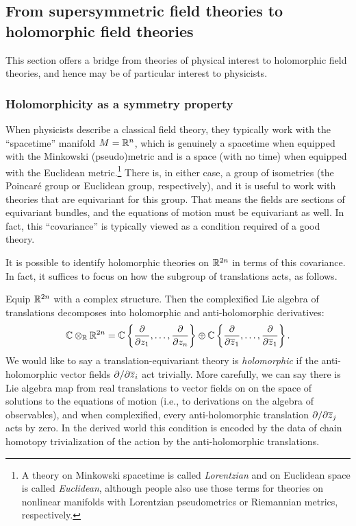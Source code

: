 \documentclass[11pt]{amsart}
\def\del{\partial}
\begin{document}
\subsection{From supersymmetric field theories to holomorphic field theories}



This section offers a bridge from theories of physical interest to holomorphic field theories,
and hence may be of particular interest to physicists.

\subsubsection{Holomorphicity as a symmetry property}

When physicists describe a classical field theory,
they typically work with the ``spacetime'' manifold $M = \mathbb R^n$,
which is genuinely a spacetime when equipped with the Minkowski (pseudo)metric and is a space (with no time) when equipped with the Euclidean metric.\footnote{A theory on Minkowski spacetime is called {\it Lorentzian} and on Euclidean space is called {\it Euclidean},
although people also use those terms for theories on nonlinear manifolds with Lorentzian pseudometrics or Riemannian metrics, respectively.}
There is, in either case, a group of isometries (the Poincar\'e group or Euclidean group, respectively),
and it is useful to work with theories that are equivariant for this group.
That means the fields are sections of equivariant bundles,
and the equations of motion must be equivariant as well.
In fact, this ``covariance'' is typically viewed as a condition required of a good theory.

It is possible to identify holomorphic theories on $\mathbb R^{2n}$ in terms of this covariance.
In fact, it suffices to focus on how the subgroup of translations acts, as follows.

Equip $\mathbb R^{2n}$ with a complex structure.
Then the complexified Lie algebra of translations decomposes into holomorphic and anti-holomorphic derivatives:
\[
\mathbb C \otimes_{\mathbb R} \mathbb R^{2n} 
= \mathbb C\left\{\frac{\partial}{\partial z_1}, \ldots, \frac{\partial}{\partial z_n}\right\} 
\oplus \mathbb C\left\{\frac{\partial}{\partial {\overline{z}}_1}, \ldots, \frac{\partial}{\partial {\overline{z}}_1}\right\}.
\]
We would like to say a translation-equivariant theory is {\em holomorphic} if the anti-holomorphic vector fields $\del / \del {\zbar_i}$ act trivially.
More carefully, we can say there is Lie algebra map from real translations to vector fields on on the space of solutions to the equations of motion (i.e., to derivations on the algebra of observables),
and when complexified, every anti-holomorphic translation $\partial/\partial {\overline{z}}_j$ acts by zero.
In the derived world this condition is encoded by the data of chain homotopy trivialization of the action by the anti-holomorphic translations. 
\end{document}
